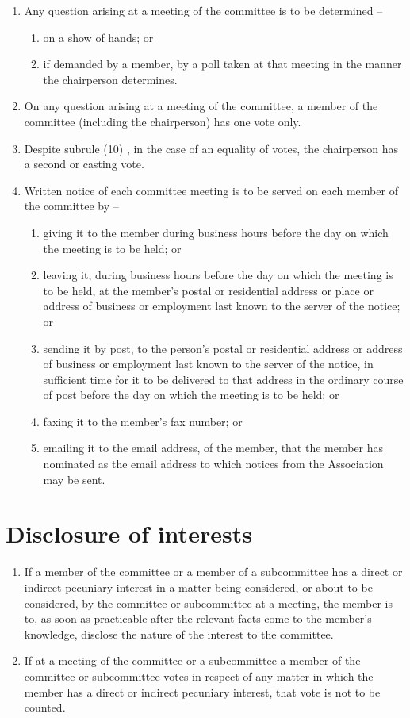 \documentclass[a4paper,11pt]{article}
\begin{document}
\begin{enumerate}
	\item Any question arising at a meeting of the committee is to be determined --
	\begin{enumerate}
		\item on a show of hands; or
		\item if demanded by a member, by a poll taken at that meeting in the manner the chairperson determines.
	\end{enumerate}
	
	\item On any question arising at a meeting of the committee, a member of the committee (including the chairperson) has one vote only.
	\item Despite subrule (10) , in the case of an equality of votes, the chairperson has a second or casting vote.

	\item Written notice of each committee meeting is to be served on each member of the committee by --
	\begin{enumerate}
		\item giving it to the member during business hours before the day on which the meeting is to be held; or
		\item leaving it, during business hours before the day on which the meeting is to be held, at the member's postal or residential address or place or address of business or employment last known to the server of the notice; or
		\item sending it by post, to the person's postal or residential address or address of business or employment last known to the server of the notice, in sufficient time for it to be delivered to that address in the ordinary course of post before the day on which the meeting is to be held; or
		\item faxing it to the member's fax number; or
		\item emailing it to the email address, of the member, that the member has nominated as the email address to which notices from the Association may be sent.
	\end{enumerate}
\end{enumerate}

\section{Disclosure of interests}
\begin{enumerate}
	\item If a member of the committee or a member of a subcommittee has a direct or indirect pecuniary interest in a matter being considered, or about to be considered, by the committee or subcommittee at a meeting, the member is to, as soon as practicable after the relevant facts come to the member's knowledge, disclose the nature of the interest to the committee.
	\item If at a meeting of the committee or a subcommittee a member of the committee or subcommittee votes in respect of any matter in which the member has a direct or indirect pecuniary interest, that vote is not to be counted.
\end{enumerate}
\end{document}
